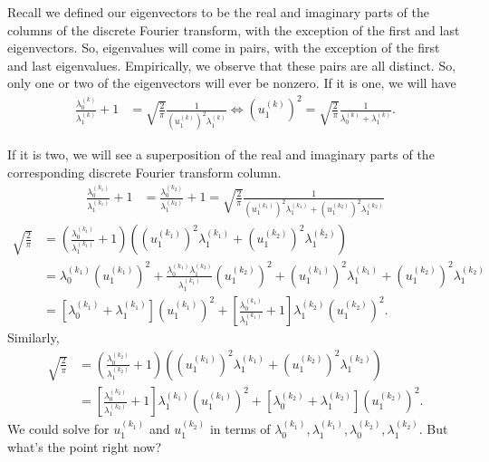 \documentclass{article}
\begin{document}
Recall we defined our eigenvectors to be the real and imaginary parts of the columns of the discrete Fourier transform, with the exception of the first and last eigenvectors.
So, eigenvalues will come in pairs, with the exception of the first and last eigenvalues.
Empirically, we observe that these pairs are all distinct.
So, only one or two of the eigenvectors will ever be nonzero.
If it is one, we will have
\begin{align}
  \frac{ \lambda_0^{(k)} }{ \lambda_1^{(k)} } + 1 &= \sqrt{\frac{2}{\pi}} \frac{1}{ (u_1^{(k)})^2 \lambda_1^{(k)} }
  \iff
  (u_1^{(k)})^2 = \sqrt{ \frac{2}{\pi} } \frac{1}{ \lambda_0^{(k)} + \lambda_1^{(k)} }.
\end{align}

If it is two, we will see a superposition of the real and imaginary parts of the corresponding discrete Fourier transform column.
\begin{align}
  \frac{ \lambda_0^{(k_1)} }{ \lambda_1^{(k_1)} } + 1
  &= \frac{ \lambda_0^{(k_2)} }{ \lambda_1^{(k_2)} } + 1
  = \sqrt{\frac{2}{\pi}} \frac{1}{ (u_1^{(k_1)})^2 \lambda_1^{(k_1)} + (u_1^{(k_2)})^2 \lambda_1^{(k_2)} }
\end{align}
\begin{align}
  \sqrt{\frac{2}{\pi}} 
  &= \left( \frac{ \lambda_0^{(k_1)} }{ \lambda_1^{(k_1)} } + 1 \right) \left( (u_1^{(k_1)})^2 \lambda_1^{(k_1)} + (u_1^{(k_2)})^2 \lambda_1^{(k_2)} \right) \\
  &= \lambda_0^{(k_1)} (u_1^{(k_1)})^2 + \frac{ \lambda_0^{(k_1)} \lambda_1^{(k_2)} }{ \lambda_1^{(k_1)} } (u_1^{(k_2)})^2 + (u_1^{(k_1)})^2 \lambda_1^{(k_1)} + (u_1^{(k_2)})^2 \lambda_1^{(k_2)} \\
  &= \left[ \lambda_0^{(k_1)} + \lambda_1^{(k_1)} \right] (u_1^{(k_1)})^2 + \left[ \frac{ \lambda_0^{(k_1)} }{ \lambda_1^{(k_1)} } + 1 \right] \lambda_1^{(k_2)} (u_1^{(k_2)})^2.
\end{align}
Similarly,
\begin{align}
  \sqrt{\frac{2}{\pi}} 
  &= \left( \frac{ \lambda_0^{(k_2)} }{ \lambda_1^{(k_2)} } + 1 \right) \left( (u_1^{(k_1)})^2 \lambda_1^{(k_1)} + (u_1^{(k_2)})^2 \lambda_1^{(k_2)} \right) \\
  &= \left[ \frac{ \lambda_0^{(k_2)} }{ \lambda_1^{(k_2)} } + 1 \right] \lambda_1^{(k_1)} (u_1^{(k_1)})^2 + \left[ \lambda_0^{(k_2)} + \lambda_1^{(k_2)} \right] (u_1^{(k_2)})^2.
\end{align}
We could solve for $u_1^{(k_1)}$ and $u_1^{(k_2)}$ in terms of $\lambda_0^{(k_1)}, \lambda_1^{(k_1)}, \lambda_0^{(k_2)}, \lambda_1^{(k_2)}$.
But what's the point right now?
\end{document}
